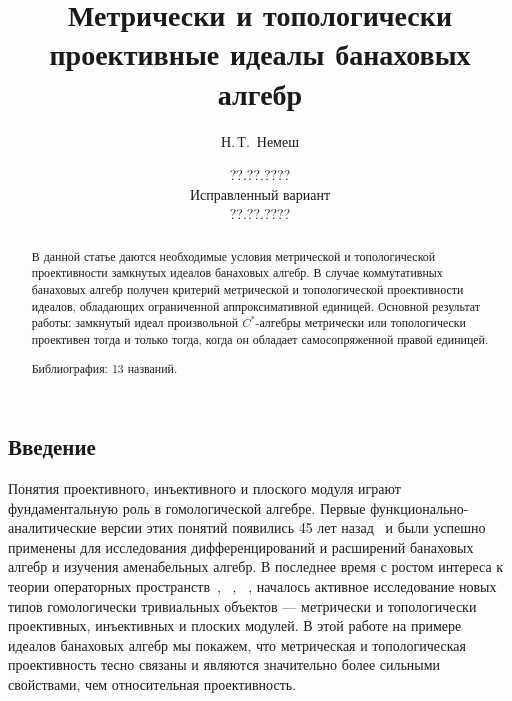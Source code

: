 \documentclass[12pt]{article}
\numberwithin{equation}{subsection}
\theoremstyle{plain}
\begin{document}

\date{??.??.????\\
Исправленный вариант\\??.??.????}

\author{Н.\,Т.~Немеш}
\address{Московский государственный университет \\им. М. В. Ломоносова}

\title{Метрически и топологически проективные идеалы банаховых алгебр}

\maketitle

\begin{fulltext}
\begin{abstract}

В данной статье даются необходимые условия метрической и топологической
проективности замкнутых идеалов банаховых алгебр. В случае коммутативных
банаховых алгебр получен критерий метрической и топологической проективности
идеалов, обладающих ограниченной аппроксимативной единицей. Основной результат
работы: замкнутый идеал произвольной $C^*$-алгебры метрически или топологически
проективен тогда и только тогда, когда он обладает самосопряженной правой
единицей.

Библиография: 13 названий.
\end{abstract}


\section{Введение}\label{MetricAndTopologicalProjectivity}

Понятия проективного, инъективного и плоского модуля играют фундаментальную роль
в гомологической алгебре. Первые функционально-аналитические версии этих понятий
появились 45 лет назад~\cite{HelemHomolDimNorModBanAlg} и были успешно применены
для исследования дифференцирований и расширений банаховых алгебр и изучения
аменабельных алгебр. В последнее время с ростом интереса к теории операторных
пространств~\cite{WittstockOpVersionHahnBanachTh},
~\cite{EffOzawRuanInjAndNuclOpSp},
~\cite{ForrestProjOpSpAlmstPeriodAndComplCmplmntdIdInFourierAlg}, началось
активное исследование новых типов гомологически тривиальных объектов ---
метрически и топологически проективных, инъективных и плоских модулей. В этой
работе на примере идеалов банаховых алгебр мы покажем, что метрическая и
топологическая проективность тесно связаны и являются значительно более сильными
свойствами, чем относительная проективность.


\end{fulltext}
\end{document}

